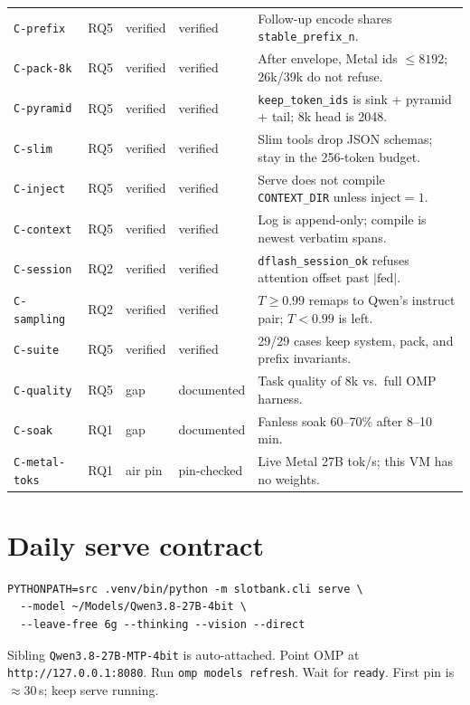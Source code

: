 {\begin{longtable}{@{}llllp{6.6cm}@{}}
\texttt{C-prefix} & RQ5 & verified & verified & Follow-up encode shares \texttt{stable\_prefix\_n}. \\
\texttt{C-pack-8k} & RQ5 & verified & verified & After envelope, Metal ids $\le 8192$; 26k/39k do not refuse. \\
\texttt{C-pyramid} & RQ5 & verified & verified & \texttt{keep\_token\_ids} is sink + pyramid + tail; 8k head is 2048. \\
\texttt{C-slim} & RQ5 & verified & verified & Slim tools drop JSON schemas; stay in the 256-token budget. \\
\texttt{C-inject} & RQ5 & verified & verified & Serve does not compile \texttt{CONTEXT\_DIR} unless inject${=}1$. \\
\texttt{C-context} & RQ5 & verified & verified & Log is append-only; compile is newest verbatim spans. \\
\texttt{C-session} & RQ2 & verified & verified & \texttt{dflash\_session\_ok} refuses attention offset past $|\mathrm{fed}|$. \\
\texttt{C-sampling} & RQ2 & verified & verified & $T\ge 0.99$ remaps to Qwen's instruct pair; $T<0.99$ is left. \\
\texttt{C-suite} & RQ5 & verified & verified & 29/29 cases keep system, pack, and prefix invariants. \\
\texttt{C-quality} & RQ5 & gap & documented & Task quality of 8k vs.\ full OMP harness. \\
\texttt{C-soak} & RQ1 & gap & documented & Fanless soak 60--70\% after 8--10 min. \\
\texttt{C-metal-toks} & RQ1 & air pin & pin-checked & Live Metal 27B tok/s; this VM has no weights. \\
\bottomrule
\end{longtable}
}

\section{Daily serve contract}
\label{app:serve}

\begin{verbatim}
PYTHONPATH=src .venv/bin/python -m slotbank.cli serve \
  --model ~/Models/Qwen3.8-27B-4bit \
  --leave-free 6g --thinking --vision --direct
\end{verbatim}

Sibling \texttt{Qwen3.8-27B-MTP-4bit} is auto-attached. Point OMP at \texttt{http://127.0.0.1:8080}. Run \texttt{omp models refresh}. Wait for \texttt{ready}. First pin is $\approx 30$\,s; keep serve running.

